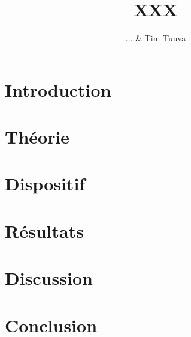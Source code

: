 \documentclass[a4paper,12pt,oneside]{article}
\begin{document}
\title{XXX}%
\author{ ... \& Tim Tuuva}

\maketitle
\tableofcontents
\baselineskip=16pt
\parindent=15pt
\parskip=5pt

\begin{abstract}

\end{abstract}

\section{Introduction}


\section{Théorie}


\section{Dispositif}



\section{Résultats}


\section{Discussion}


\section{Conclusion}


\cite{article}
\cite{book}

\medskip
 


\end{document}

